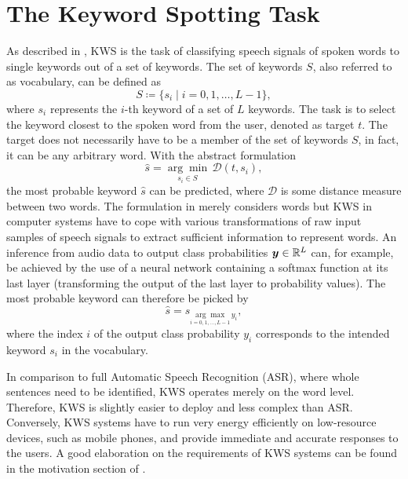 
\section{The Keyword Spotting Task}\label{sec:intro_kws}
As described in , KWS is the task of classifying speech signals of spoken words to single keywords out of a set of keywords.
The set of keywords $S$, also referred to as vocabulary, can be defined as
\begin{equation}\label{eq:intro_kws_dict}
	S \coloneqq \{s_i \mid i = 0, 1, \dots, L - 1\},
\end{equation}
where $s_i$ represents the $i$-th keyword of a set of $L$ keywords.
The task is to select the keyword closest to the spoken word from the user, denoted as target $t$.
The target does not necessarily have to be a member of the set of keywords $S$, in fact, it can be any arbitrary word.
With the abstract formulation
\begin{equation}\label{eq:intro_kws_task}
	\hat{s} = \underset{s_i \in S}{\arg \min} \, \mathcal{D}(t, s_i),
\end{equation}
the most probable keyword $\hat{s}$ can be predicted, where $\mathcal{D}$ is some distance measure between two words.
The formulation in  merely considers words but KWS in computer systems have to cope with various transformations of raw input samples of speech signals to extract sufficient information to represent words.
An inference from audio data to output class probabilities $\bm{y} \in \mathbb{R}^L$ can, for example, be achieved by the use of a neural network containing a softmax function at its last layer (transforming the output of the last layer to probability values).
The most probable keyword can therefore be picked by
\begin{equation}\label{eq:intro_kws_class}
	\hat{s} = s_{\underset{i = 0, 1, \dots, L - 1}{\arg \max} \, y_i},
\end{equation}
where the index $i$ of the output class probability $y_i$ corresponds to the intended keyword $s_i$ in the vocabulary.

In comparison to full Automatic Speech Recognition (ASR), where whole sentences need to be identified, KWS operates merely on the word level.
Therefore, KWS is slightly easier to deploy and less complex than ASR.
Conversely, KWS systems have to run very energy efficiently on low-resource devices, such as mobile phones, and provide immediate and accurate responses to the users.
A good elaboration on the requirements of KWS systems can be found in the motivation section of \cite{Warden2018SpeechCommands}.